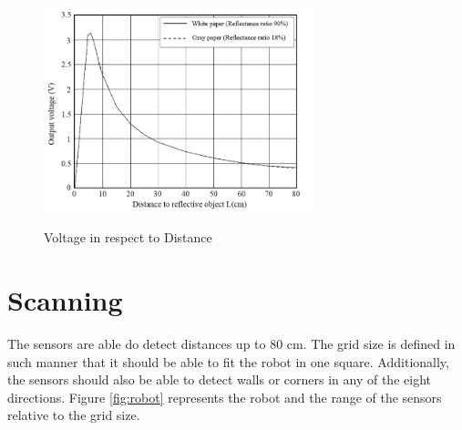 \begin{figure}[htp]
	\centering
	\includegraphics[width=0.7\textwidth]{figures/scan/OutputVoltage.png}
	\caption{Voltage in respect to Distance}\cite{datasheet}
	\label{fig:distance_voltage}
\end{figure}
\newpage
\section{Scanning}\label{sec:scanning}

The sensors are able do detect distances up to 80 cm. The grid size is 
defined in such manner that it should be able to fit the robot in one square. 
Additionally, the sensors should also be able to detect walls or corners in 
any of the eight directions.
Figure \ref{fig:robot} represents the robot and the range of the sensors relative
to the grid size.

